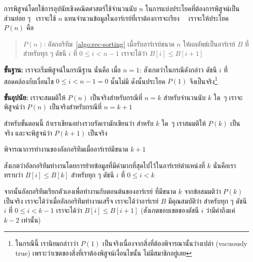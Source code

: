 การ{\wbr}พิสูจน์{\wbr}โดย{\wbr}ใช้{\wbr}การ{\wbr}อุปนัย{\wbr}เชิง{\wbr}คณิตศาสตร์{\wbr}ใช้{\wbr}จำนวนนับ $n$
ใน{\wbr}การ{\wbr}แบ่ง{\wbr}ประโยค{\wbr}ที่{\wbr}ต้องการ{\wbr}พิสูจน์{\wbr}เป็น{\wbr}ส่วนย่อย ๆ \ เรา{\wbr}จะ{\wbr}ใช้ $n$
แทน{\wbr}จำนวน{\wbr}ข้อมูล{\wbr}ใน{\wbr}อาร์เรย์{\wbr}ที่{\wbr}เรา{\wbr}ต้องการ{\wbr}จะ{\wbr}เรียง \ \ เรา{\wbr}จะ{\wbr}ให้{\wbr}ประโยค $P(n)$ คือ{\wbr}
\begin{quote}
$P(n)$: อัล{\wbr}กอ{\wbr}ริ{\wbr}ทึม~\ref{algo:rec-sorting} เมื่อ{\wbr}รับ{\wbr}อาร์เรย์{\wbr}ขนาด $n$ ให้{\wbr}ผลลัพธ์{\wbr}เป็น{\wbr}อาร์เรย์
  $B$ ที่{\wbr}สำหรับ{\wbr}ทุก ๆ ดัชนี $i$ ที่ $0\leq i<n-1$ เรา{\wbr}จะ{\wbr}ได้{\wbr}ว่า $B[i]\leq B[i+1]$
\end{quote}

{\bf ขั้น{\wbr}ฐาน:} เรา{\wbr}จะ{\wbr}เริ่ม{\wbr}พิสูจน์{\wbr}ใน{\wbr}กรณี{\wbr}ฐาน นั่น{\wbr}คือ เมื่อ $n=1$: สังเกต{\wbr}ว่า{\wbr}ใน{\wbr}กรณี{\wbr}ดังกล่าว{\wbr}
ดัชนี $i$ ที่{\wbr}สอดคล้อง{\wbr}กับ{\wbr}เงื่อนไข $0\leq i < n-1=0$ นั้น{\wbr}ไม่{\wbr}มี ดังนั้น{\wbr}ประโยค $P(1)$
จึง{\wbr}เป็นจริง\footnote{ใน{\wbr}กรณี{\wbr}นี้ เรา{\wbr}นิยม{\wbr}กล่าว{\wbr}ว่า $P(1)$
  เป็นจริง{\wbr}เนื่องจาก{\wbr}สิ่ง{\wbr}ที่{\wbr}ต้อง{\wbr}พิจารณา{\wbr}นั้น{\wbr}ว่างเปล่า (vacuously true)
  เพราะว่า{\wbr}เซต{\wbr}ของ{\wbr}สิ่ง{\wbr}ที่{\wbr}เรา{\wbr}ต้อง{\wbr}พิสูจน์{\wbr}เงื่อนไข{\wbr}นั้น ไม่{\wbr}มี{\wbr}สมาชิก{\wbr}อยู่{\wbr}เลย}

{\bf ขั้น{\wbr}อุปนัย:} เรา{\wbr}จะ{\wbr}สมมติ{\wbr}ให้ $P(n)$ เป็นจริง{\wbr}สำหรับ{\wbr}กรณี{\wbr}ที่ $n=k$ สำหรับ{\wbr}จำนวนนับ{\wbr}
$k$ ใด~ๆ เรา{\wbr}จะ{\wbr}พิสูจน์{\wbr}ว่า $P(n)$ เป็นจริง{\wbr}สำหรับ{\wbr}กรณี{\wbr}ที่ $n=k+1$

สำหรับ{\wbr}ขั้นตอน{\wbr}นี้ ถ้า{\wbr}เรา{\wbr}เขียน{\wbr}อย่าง{\wbr}รวบรัด{\wbr}เรา{\wbr}มัก{\wbr}เขียน{\wbr}ว่า สำหรับ $k$ ใด~ๆ เรา{\wbr}สมมติ{\wbr}ให้{\wbr}
$P(k)$ เป็นจริง และ{\wbr}จะ{\wbr}พิสูจน์{\wbr}ว่า $P(k+1)$ เป็นจริง 

พิจารณา{\wbr}การ{\wbr}ทำงาน{\wbr}ของ{\wbr}อัล{\wbr}กอ{\wbr}ริ{\wbr}ทึม{\wbr}เมื่อ{\wbr}อาร์เรย์{\wbr}มี{\wbr}ขนาด $k+1$

สังเกต{\wbr}ว่า{\wbr}อัล{\wbr}กอ{\wbr}ริ{\wbr}ทึม{\wbr}ทำงาน{\wbr}โดย{\wbr}การ{\wbr}ย้าย{\wbr}ข้อมูล{\wbr}ที่{\wbr}มี{\wbr}ค่า{\wbr}มาก{\wbr}ที่สุด{\wbr}ไป{\wbr}ไว้{\wbr}ใน{\wbr}อาร์เรย์{\wbr}ตำแหน่ง{\wbr}ที่ $k$
นั่น{\wbr}คือ{\wbr}เรา{\wbr}ทราบ{\wbr}ว่า $B[i]\leq B[k]$ สำหรับ{\wbr}ทุก ๆ ดัชนี $i$ ที่ $0\leq i<k$

จากนั้น{\wbr}อัล{\wbr}กอ{\wbr}ริ{\wbr}ทึม{\wbr}เรียก{\wbr}ตัวเอง{\wbr}เพื่อ{\wbr}ทำงาน{\wbr}กับ{\wbr}ตอน{\wbr}ต้น{\wbr}ของ{\wbr}อาร์เรย์ ที่{\wbr}มี{\wbr}ขนาด $k$ จาก{\wbr}ข้อสมมติ{\wbr}ว่า{\wbr}
$P(k)$ เป็นจริง เรา{\wbr}จะ{\wbr}ได้{\wbr}ว่า{\wbr}เมื่อ{\wbr}อัล{\wbr}กอ{\wbr}ริ{\wbr}ทึม{\wbr}ทำงาน{\wbr}เสร็จ เรา{\wbr}จะ{\wbr}ได้{\wbr}ว่า{\wbr}อาร์เรย์ $B$
มี{\wbr}คุณสมบัติ{\wbr}ว่า สำหรับ{\wbr}ทุก ๆ ดัชนี $i$ ที่ $0\leq i<k-1$ เรา{\wbr}จะ{\wbr}ได้{\wbr}ว่า $B[i]\leq
B[i+1]$ (สังเกต{\wbr}ขอบเขต{\wbr}ของ{\wbr}ดัชนี $i$ ว่า{\wbr}มี{\wbr}ค่า{\wbr}ถึง{\wbr}แค่ $k-2$ เท่านั้น)

